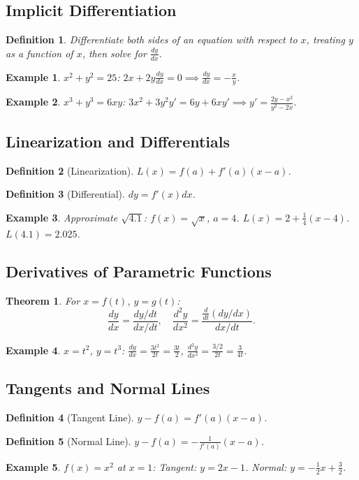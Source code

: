 \documentclass[11pt,a4paper]{article}
\newtheorem{example}{Example}
\newtheorem{theorem}{Theorem}
\newtheorem{definition}{Definition}
\begin{document}
\subsection{Implicit Differentiation}
\begin{definition}
Differentiate both sides of an equation with respect to $x$, treating $y$ as a function of $x$, then solve for $\frac{dy}{dx}$.
\end{definition}
\begin{example}
$x^2 + y^2 = 25$: $2x + 2y\frac{dy}{dx} = 0 \implies \frac{dy}{dx} = -\frac{x}{y}$.
\end{example}
\begin{example}
$x^3 + y^3 = 6xy$: $3x^2 + 3y^2 y' = 6y + 6x y' \implies y' = \frac{2y - x^2}{y^2 - 2x}$.
\end{example}
\subsection{Linearization and Differentials}
\begin{definition}[Linearization]
$L(x) = f(a) + f'(a)(x-a)$.
\end{definition}
\begin{definition}[Differential]
$dy = f'(x) dx$.
\end{definition}
\begin{example}
Approximate $\sqrt{4.1}$: $f(x) = \sqrt{x}$, $a=4$. $L(x) = 2 + \frac{1}{4}(x-4)$. $L(4.1) = 2.025$.
\end{example}
\subsection{Derivatives of Parametric Functions}
\begin{theorem}
For $x = f(t)$, $y = g(t)$:
\[
\frac{dy}{dx} = \frac{dy/dt}{dx/dt}, \quad \frac{d^2y}{dx^2} = \frac{\frac{d}{dt}(dy/dx)}{dx/dt}.
\]
\end{theorem}
\begin{example}
$x = t^2$, $y = t^3$: $\frac{dy}{dx} = \frac{3t^2}{2t} = \frac{3t}{2}$, $\frac{d^2y}{dx^2} = \frac{3/2}{2t} = \frac{3}{4t}$.
\end{example}
\subsection{Tangents and Normal Lines}
\begin{definition}[Tangent Line]
$y - f(a) = f'(a)(x-a)$.
\end{definition}
\begin{definition}[Normal Line]
$y - f(a) = -\frac{1}{f'(a)}(x-a)$.
\end{definition}
\begin{example}
$f(x) = x^2$ at $x=1$: Tangent: $y = 2x - 1$. Normal: $y = -\frac{1}{2}x + \frac{3}{2}$.
\end{example}
\end{document}
